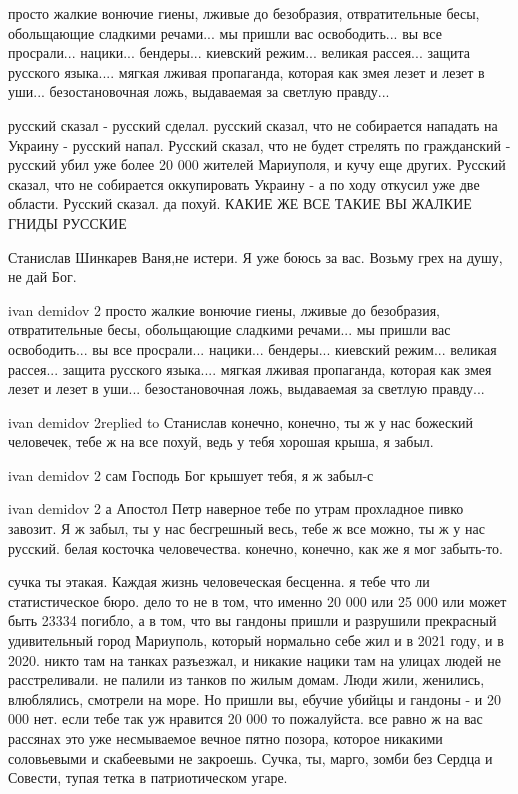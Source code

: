 
просто жалкие вонючие гиены, лживые до безобразия, отвратительные бесы,
обольщающие сладкими речами... мы пришли вас освободить... вы все просрали...
нацики... бендеры... киевский режим... великая рассея... защита русского
языка.... мягкая лживая пропаганда, которая как змея лезет и лезет в уши...
безостановочная ложь, выдаваемая за светлую правду...

русский сказал - русский сделал. русский сказал, что не собирается нападать на
Украину - русский напал. Русский сказал, что не будет стрелять по гражданский -
русский убил уже более 20 000 жителей Мариуполя, и кучу еще других. Русский
сказал, что не собирается оккупировать Украину - а по ходу откусил уже две
области. Русский сказал. да похуй. КАКИЕ ЖЕ ВСЕ ТАКИЕ ВЫ ЖАЛКИЕ ГНИДЫ РУССКИЕ

Станислав Шинкарев Ваня,не истери. Я уже боюсь за вас. Возьму грех на душу, не
дай Бог.

ivan demidov 2 просто жалкие вонючие гиены, лживые до безобразия,
отвратительные бесы, обольщающие сладкими речами... мы пришли вас освободить...
вы все просрали... нацики... бендеры... киевский режим... великая рассея...
защита русского языка.... мягкая лживая пропаганда, которая как змея лезет и
лезет в уши... безостановочная ложь, выдаваемая за светлую правду...

ivan demidov 2replied to Станислав конечно, конечно, ты ж у нас божеский
человечек, тебе ж на все похуй, ведь у тебя хорошая крыша, я забыл.

ivan demidov 2 сам Господь Бог крышует тебя, я ж забыл-с

ivan demidov 2 а Апостол Петр наверное тебе по утрам прохладное пивко завозит.
Я ж забыл, ты у нас бесгрешный весь, тебе ж все можно, ты ж у нас русский.
белая косточка человечества. конечно, конечно, как же я мог забыть-то.

сучка ты этакая. Каждая жизнь человеческая бесценна. я тебе что ли
статистическое бюро. дело то не в том, что именно 20 000 или 25 000 или может
быть 23334 погибло, а в том, что вы гандоны пришли и разрушили прекрасный
удивительный город Мариуполь, который нормально себе жил и в 2021 году, и в
2020. никто там на танках разъезжал, и никакие нацики там на улицах людей не
расстреливали. не палили из танков по жилым домам. Люди жили, женились,
влюблялись, смотрели на море. Но пришли вы, ебучие убийцы и гандоны - и 20 000
нет. если тебе так уж нравится 20 000 то пожалуйста. все равно ж на вас
рассянах это уже несмываемое вечное пятно позора, которое никакими соловьевыми
и скабеевыми не закроешь. Сучка, ты, марго, зомби без Сердца и Совести, тупая
тетка в патриотическом угаре.

